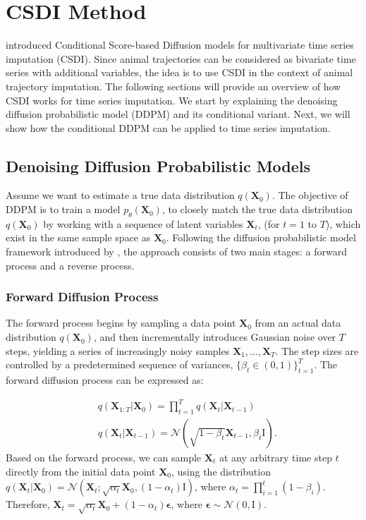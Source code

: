 \documentclass[11pt]{article}
\begin{document}
\section{CSDI Method}
\citet{tashiro2021csdi} introduced Conditional Score-based Diffusion models for multivariate time series imputation (CSDI). Since animal trajectories can be considered as bivariate time series with additional variables, the idea is to use CSDI in the context of animal trajectory imputation. The following sections will provide an overview of how CSDI works for time series imputation. We start by explaining the denoising diffusion probabilistic model (DDPM) and its conditional variant. Next, we will show how the conditional DDPM can be applied to time series imputation. 

\subsection{Denoising Diffusion Probabilistic Models}\label{sec: ddpm}
Assume we want to estimate a true data distribution $q(\bm{X}_0)$. The objective of DDPM is to train a model $p_{\theta}(\bm{X}_0)$, to closely match the true data distribution $q(\bm{X}_0)$ by working with a sequence of latent variables $\bm{X}_t$, (for $t=1$ to $T$), which exist in the same sample space as $\bm{X}_0$. Following the diffusion probabilistic model framework introduced by \citet{ho2020denoising}, the approach consists of two main stages: a forward process and a reverse process.
\subsubsection*{Forward Diffusion Process}
The forward process begins by sampling a data point $\bm{X}_0$ from an actual data distribution $q(\bm{X}_0)$, and then incrementally introduces Gaussian noise over $T$ steps, yielding a series of increasingly noisy samples $\bm{X}_1,\ldots,\bm{X}_T$. The step sizes are controlled by a predetermined sequence of variances, $\{\beta_t\in(0,1)\}_{t=1}^T$. The forward diffusion process can be expressed as:


\begin{align}\label{eq: forward diffusion}
	&q(\bm{X}_{1:T}|\bm{X}_0)=\prod_{t=1}^{T}q(\bm{X}_t|\bm{X}_{t-1})\\
	&q(\bm{X}_t|\bm{X}_{t-1})=\mathcal{N}(\sqrt{1-\beta_t}\bm{X}_{t-1}, \beta_t\bm{\mathrm{I}}).
\end{align}
Based on the forward process, we can sample $\bm{X}_t$ at any arbitrary time step $t$ directly from the initial data point $\bm{X}_0$, using the distribution $q(\bm{X}_t|\bm{X}_0)=\mathcal{N}(\bm{X}_t;\sqrt{\alpha_t}\bm{X}_0, (1-\alpha_t)\bm{\mathrm{I}})$, where $\alpha_t=\prod_{i=1}^t (1-\beta_i)$.  Therefore, $\bm{X}_t=\sqrt{\alpha_t}\bm{X}_0+(1-\alpha_t)\bm{\epsilon}$, where $\bm{\epsilon}\sim \mathcal{N}(0, \bm{\mathrm{I}})$. 
\end{document}
